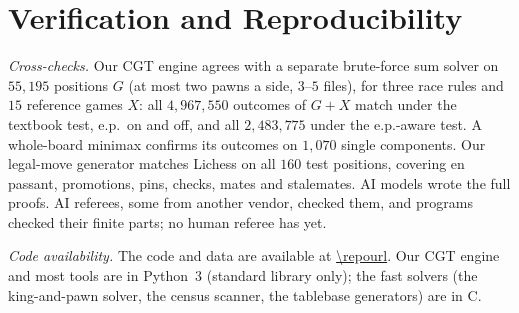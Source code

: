 \providecommand{\codeavail}{available at \expandafter\url\expandafter{\repourl}}

\section{Verification and Reproducibility}\label{sec:verify}

\emph{Cross-checks.} Our CGT engine agrees with a separate brute-force sum solver on $55{,}195$ positions $G$
(at most two pawns a side, $3$--$5$ files), for three race rules and $15$ reference games $X$: all
$4{,}967{,}550$ outcomes of $G+X$ match under the textbook test, e.p.\ on and off, and all $2{,}483{,}775$
under the e.p.-aware test. A whole-board minimax confirms its outcomes on $1{,}070$ single components. Our
legal-move generator matches Lichess on all $160$ test positions, covering en passant, promotions, pins, checks,
mates and stalemates. AI models wrote the full  proofs. AI referees, some from another vendor, checked them, and
programs checked their finite parts; no human referee has yet.

\emph{Code availability.} The code and data are \codeavail. Our CGT engine and most tools are in
Python~3 (standard library only); the fast solvers (the king-and-pawn solver, the census scanner, the tablebase
generators) are in C.
